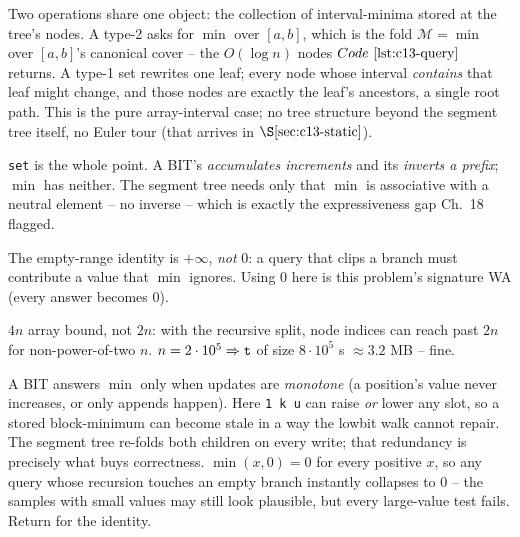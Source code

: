 Two operations share one object: the collection of interval-minima stored at
the tree's nodes.  A type-2 asks for \(\min\) over \([a,b]\), which is the fold
\(\mathcal{M}=\min\) over \([a,b]\)'s canonical cover -- the \(O(\log n)\) nodes
\(\coderef{c13-query}\) returns.  A type-1 set rewrites one leaf; every node
whose interval \emph{contains} that leaf might change, and those nodes are
exactly the leaf's ancestors, a single root path.  This is the pure
array-interval case; no tree structure beyond the segment tree itself, no
Euler tour (that arrives in \(\secref{c13-static}\)).

\begin{observation}
\texttt{set} is the whole point.  A BIT's  \emph{accumulates
increments} and its  \emph{inverts a prefix}; \(\min\) has neither.
The segment tree needs only that \(\min\) is associative with a neutral
element -- no inverse -- which is exactly the expressiveness gap Ch.~18 flagged.
\end{observation}
\begin{observation}
The empty-range identity is \(+\infty\), \emph{not} \(0\): a query that
clips a branch must contribute a value that \(\min\) ignores.  Using \(0\)
here is this problem's signature WA (every answer becomes \(0\)).
\end{observation}
\begin{observation}
\(4n\) array bound, not \(2n\): with the recursive split, node indices can
reach past \(2n\) for non-power-of-two \(n\).  \(n=2\cdot10^5\Rightarrow
\texttt{t}\) of size \(8\cdot10^5\) s \(\approx 3.2\) MB -- fine.
\end{observation}

\begin{thinkbox}
{A BIT answers \(\min\) only when updates are \emph{monotone} (a position's
value never increases, or only appends happen).  Here \texttt{1 k u} can raise
\emph{or} lower any slot, so a stored block-minimum can become stale in a way
the lowbit walk cannot repair.  The segment tree re-folds both children on
every write; that redundancy is precisely what buys correctness.}
{\(\min(x,0)=0\) for every positive \(x\), so any query whose recursion
touches an empty branch instantly collapses to \(0\) -- the samples with small
values may still look plausible, but every large-value test fails.  Return
 for the identity.}
\end{thinkbox}

